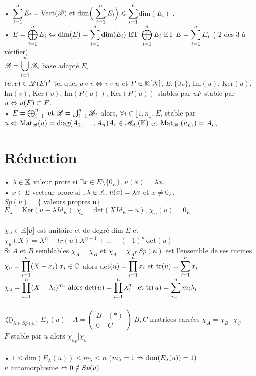 \documentclass[12 pt]{book}
\begin{document}
• $\displaystyle{\sum_{i=1}^nE_i = \text{Vect}(\mathscr{B}) \text{ et dim} \Big(\, \sum_{i=1}^nE_i \Big) \leqslant \sum_{i=1}^n}$dim$(E_i)$ .\\
• $\displaystyle{ E = \bigoplus_{i=1}^n E_i \Leftrightarrow\text{dim}(E) = \sum_{i=1}^n\text{dim}(E_i) \text{ ET }  \bigoplus_{i=1}^n E_i\text{ ET }E = \sum_{i=1}^nE_i }$
( 2 des 3 à vérifier)\\
$\displaystyle{\mathscr{B}= \bigcup_{i=1}^n \mathscr{B}_i}$ base adapté $E_i$\\
$ (u,v) \in \mathscr{L}(E)^2$ tel quel $u\circ v \Leftrightarrow v\circ u$ et $P\in\mathbb{K}[X]$, $E, \{0_E\}$, Im$(u)$, Ker$(u)$, Im$(v)$, Ker$(v)$, Im$(P(u))$, Ker$(P(u))$ stables par $u$\quad $F$ stable par $u \Leftrightarrow u(F)\subset F$.\\
• $ E = \bigoplus_{i=1}^n \text{ et } \mathscr{B} = \bigcup_{i=1}^n \mathscr{B}_i$ alors, $\forall i \in \llbracket 1,n \rrbracket, E_i$ stable par $u \Leftrightarrow \text{Mat}_{\mathscr{B}} (u) =\text{diag}(A_1,\dots,A_n)\\ A_i\in \mathscr{M}_{d_i}(\mathbb{K})$ et $\text{Mat}_{\mathscr{B}_i}(u_{E_i}) = A_i$\,.\\
\section*{Réduction}

• $\lambda\in \mathbb{K}$ valeur prore si $\exists x\in E\setminus \{0_E\}, \, u(x) = \lambda x$.\\
• $x \in E$ vecteur prore si $\exists \lambda \in \mathbb{K}, \, u(x) = \lambda x$ et $x\neq 0_E$.\\
$Sp(u) =\{$ valeurs propres u\} \ $E_\lambda = \text{Ker}(u - \lambda Id_E) \ \ \chi_u = \text{det}(XId_E - u), \, \chi_u(u) = 0_E$\\
\text{}\\
$\chi_u \in \mathbb{K}[u]$ est unitaire et de degré dim $E$ et $\chi_u(X) = X^n - tr(u)X^{n-1} + \dots + (-1)^n \,$det$(u)$\\
Si $A$ et $B$ semblables $\chi_A = \chi_B$ et $\chi_A = \chi_{A^T} \ Sp(u)$ est l'ensemble de ses racines\\
$\displaystyle{\chi_u = \prod_{i=1}^n(X - x_i)} \; x_i\in \mathbb{C}$ alors det$\displaystyle{(u) = \prod_{i=1}^nx_i}\text{ et } \text{tr}(u) = \sum_{i=1}^n x_i$\\ 
$\displaystyle{ \chi_u = \prod_{i=1}^n(X-\lambda_i)^{m_i} \text{ alors det}(u) = \prod_{i=1}^n\lambda_i^{m_i} \text{ et tr}(u) = \sum_{i=1}^nm_i \lambda_i}$\\
\text{}\\
$\displaystyle{\bigoplus_{\lambda \in Sp(u)} E_\lambda(u)} \quad A = \begin{pmatrix} B & (*) \\ 0 & C \end{pmatrix} \; B,C$ matrices carrées $\chi_A = \chi_B \cdot \chi_C$\\
$F$ stable par $u$ alors $\chi_{u_F} | \chi_u$\\
\text{}\\
• $1 \leqslant \text{dim}(E_\lambda(u)) \leqslant m_\lambda \leqslant n$ \; ($m_\lambda = 1 \Rightarrow \text{dim}(E_\lambda(u)) =1)$\\
$u$ automorphisme $\Leftrightarrow 0 \notin Sp(u)$\\
\end{document}
